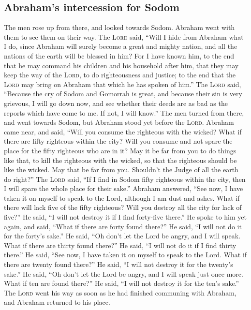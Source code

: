 \hypertarget{abrahams-intercession-for-sodom}{%
\subsection{Abraham's intercession for
Sodom}\label{abrahams-intercession-for-sodom}}

 The men rose up from there, and looked towards Sodom.
Abraham went with them to see them on their way.  The
\textsc{Lord} said, ``Will I hide from Abraham what I do,
 since Abraham will surely become a great and mighty
nation, and all the nations of the earth will be blessed in him?
 For I have known him, to the end that he may command his
children and his household after him, that they may keep the way of the
\textsc{Lord}, to do righteousness and justice; to the end that the
\textsc{Lord} may bring on Abraham that which he has spoken of him.''
 The \textsc{Lord} said, ``Because the cry of Sodom and
Gomorrah is great, and because their sin is very grievous,
 I will go down now, and see whether their deeds are as
bad as the reports which have come to me. If not, I will know.''
 The men turned from there, and went towards Sodom, but
Abraham stood yet before the \textsc{Lord}.  Abraham came
near, and said, ``Will you consume the righteous with the wicked?
 What if there are fifty righteous within the city? Will
you consume and not spare the place for the fifty righteous who are in
it?  May it be far from you to do things like that, to
kill the righteous with the wicked, so that the righteous should be like
the wicked. May that be far from you. Shouldn't the Judge of all the
earth do right?''  The \textsc{Lord} said, ``If I find in
Sodom fifty righteous within the city, then I will spare the whole place
for their sake.''  Abraham answered, ``See now, I have
taken it on myself to speak to the Lord, although I am dust and ashes.
 What if there will lack five of the fifty righteous?
Will you destroy all the city for lack of five?'' He said, ``I will not
destroy it if I find forty-five there.''  He spoke to him
yet again, and said, ``What if there are forty found there?'' He said,
``I will not do it for the forty's sake.''  He said, ``Oh
don't let the Lord be angry, and I will speak. What if there are thirty
found there?'' He said, ``I will not do it if I find thirty there.''
 He said, ``See now, I have taken it on myself to speak
to the Lord. What if there are twenty found there?'' He said, ``I will
not destroy it for the twenty's sake.''  He said, ``Oh
don't let the Lord be angry, and I will speak just once more. What if
ten are found there?'' He said, ``I will not destroy it for the ten's
sake.''  The \textsc{Lord} went his way as soon as he had
finished communing with Abraham, and Abraham returned to his place.

